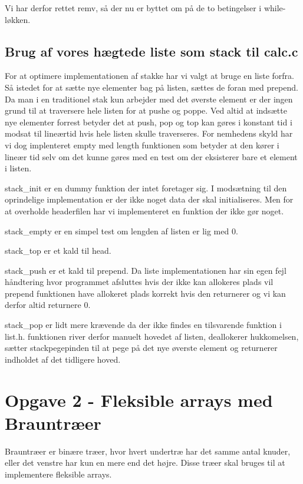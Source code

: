 \documentclass[10pt,a4paper,danish]{article}
\begin{document}
Vi har derfor rettet remv, så der nu er byttet om på de to betingelser i while-løkken.

\subsection{Brug af vores hægtede liste som stack til calc.c}
For at optimere implementationen af stakke har vi valgt at bruge en liste forfra.
Så istedet for at sætte nye elementer bag på listen, sættes de foran med prepend.
Da man i en traditionel stak kun arbejder med det øverste element er der ingen grund til at traversere hele listen for at pushe og poppe. Ved altid at indsætte nye elementer forrest betyder det at push, pop og top kan gøres i konstant tid i modsat til lineærtid hvis hele listen skulle traverseres. For nemhedens skyld har vi dog implenteret empty med length funktionen som betyder at den kører i lineær tid selv om det kunne gøres med en test om der eksisterer bare et element i listen.


stack_init er en dummy funktion der intet foretager sig.
I modsætning til den oprindelige implementation er der ikke noget data der skal initialiseres. Men for at overholde headerfilen har vi implementeret en funktion der ikke gør noget.

stack_empty er en simpel test om lengden af listen er lig med 0.

stack_top er et kald til head.

stack_push er et kald til prepend.
Da liste implementationen har sin egen fejl håndtering hvor programmet afsluttes hvis der ikke kan allokeres plads vil prepend funktionen have allokeret plads korrekt hvis den returnerer og vi kan derfor altid returnere 0.

stack_pop er lidt mere krævende da der ikke findes en tilsvarende funktion i list.h.
funktionen river derfor manuelt hovedet af listen, deallokerer hukkomelsen, sætter stackpegepinden til at pege på det nye øverste element og returnerer indholdet af det tidligere hoved.

\section{Opgave 2 - Fleksible arrays med Brauntræer}
Brauntræer er binære træer, hvor hvert undertræ har det samme antal knuder, eller det venstre har kun en mere end det højre. Disse træer skal bruges til at implementere fleksible arrays.
\end{document}

